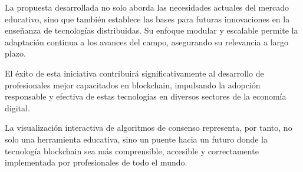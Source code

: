 \documentclass[spanish,12pt,letterpaper]{report}
\begin{document}
La propuesta desarrollada no solo aborda las necesidades actuales del mercado educativo, sino que también establece las bases para futuras innovaciones en la enseñanza de tecnologías distribuidas. Su enfoque modular y escalable permite la adaptación continua a los avances del campo, asegurando su relevancia a largo plazo.

El éxito de esta iniciativa contribuirá significativamente al desarrollo de profesionales mejor capacitados en blockchain, impulsando la adopción responsable y efectiva de estas tecnologías en diversos sectores de la economía digital.

La visualización interactiva de algoritmos de consenso representa, por tanto, no solo una herramienta educativa, sino un puente hacia un futuro donde la tecnología blockchain sea más comprensible, accesible y correctamente implementada por profesionales de todo el mundo.

\printbibliography
\end{document}
